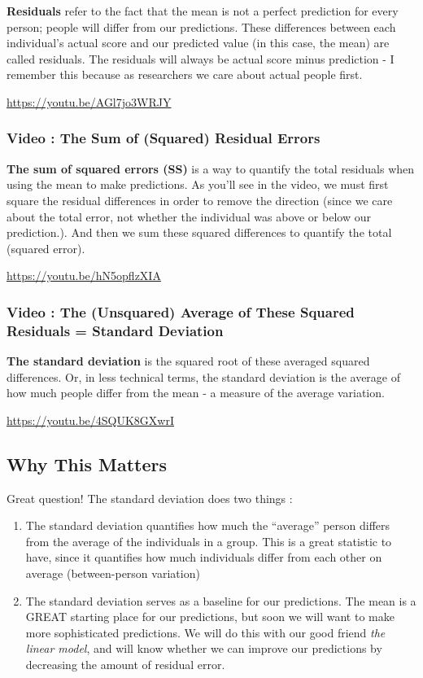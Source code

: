 \documentclass[
  letterpaper,
  DIV=11,
  numbers=noendperiod,
  oneside]{scrreprt}
\providecommand{\tightlist}{%
  \setlength{\itemsep}{0pt}\setlength{\parskip}{0pt}}\usepackage{longtable,booktabs,array}
\begin{document}
\textbf{Residuals} refer to the fact that the mean is not a perfect
prediction for every person; people will differ from our predictions.
These differences between each individual's actual score and our
predicted value (in this case, the mean) are called residuals. The
residuals will always be actual score minus prediction - I remember this
because as researchers we care about actual people first.

\url{https://youtu.be/AGl7jo3WRJY}

\subsubsection{Video : The Sum of (Squared) Residual
Errors}\label{video-the-sum-of-squared-residual-errors}

\textbf{The sum of squared errors (SS)} is a way to quantify the total
residuals when using the mean to make predictions. As you'll see in the
video, we must first square the residual differences in order to remove
the direction (since we care about the total error, not whether the
individual was above or below our prediction.). And then we sum these
squared differences to quantify the total (squared error).

\url{https://youtu.be/hN5opflzXIA}

\subsubsection{Video : The (Unsquared) Average of These Squared
Residuals = Standard
Deviation}\label{video-the-unsquared-average-of-these-squared-residuals-standard-deviation}

\textbf{The standard deviation} is the squared root of these averaged
squared differences. Or, in less technical terms, the standard deviation
is the average of how much people differ from the mean - a measure of
the average variation.

\url{https://youtu.be/4SQUK8GXwrI}

\subsection{Why This Matters}\label{why-this-matters}

Great question! The standard deviation does two things :

\begin{enumerate}
\def\labelenumi{\arabic{enumi}.}
\tightlist
\item
  The standard deviation quantifies how much the ``average'' person
  differs from the average of the individuals in a group. This is a
  great statistic to have, since it quantifies how much individuals
  differ from each other on average (between-person variation)
\item
  The standard deviation serves as a baseline for our predictions. The
  mean is a GREAT starting place for our predictions, but soon we will
  want to make more sophisticated predictions. We will do this with our
  good friend \emph{the linear model}, and will know whether we can
  improve our predictions by decreasing the amount of residual error.
\end{enumerate}
\end{document}
